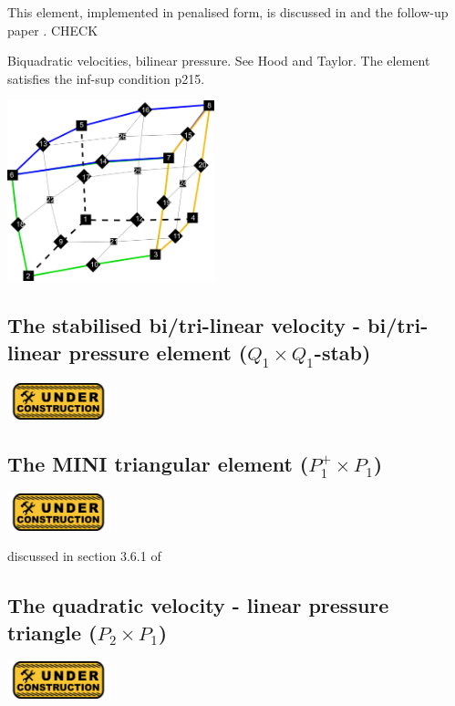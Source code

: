 This element, implemented in penalised form, is discussed in \cite{been79} and the follow-up paper \cite{been80}. CHECK

Biquadratic velocities, bilinear pressure. See Hood and Taylor. The element satisfies the inf-sup condition \cite{hugh}p215. 

\begin{center}
\includegraphics[width=6cm]{images/q2q1/q2numering}
\end{center}


\subsection{The stabilised bi/tri-linear velocity -  bi/tri-linear pressure element ($Q_1\times Q_1$-stab)}
\includegraphics[width=3cm]{images/under_construction}

\subsection{The MINI triangular element ($P_1^+\times P_1$)}
\includegraphics[width=3cm]{images/under_construction}

discussed in section 3.6.1 of \cite{john16}

\subsection{The quadratic velocity - linear pressure triangle ($P_2\times P_1$)}
\includegraphics[width=3cm]{images/under_construction}

